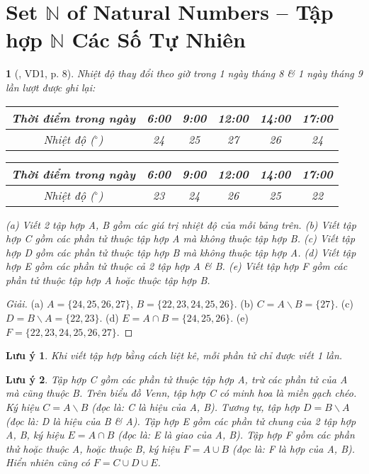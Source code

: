 \documentclass{article}
\newtheorem{baitoan}{}
\newtheorem{luuy}{Lưu ý}
\begin{document}

\section{Set $\mathbb{N}$ of Natural Numbers -- Tập hợp $\mathbb{N}$ Các Số Tự Nhiên}

\begin{baitoan}[\cite{Binh_boi_duong_Toan_6_tap_1}, VD1, p. 8]
	Nhiệt độ thay đổi theo giờ trong 1 ngày tháng 8 \& 1 ngày tháng 9 lần lượt được ghi lại:
	\begin{table}[H]
		\centering
		\begin{tabular}{|c|c|c|c|c|c|}
			\hline
			Thời điểm trong ngày & 6:00 & 9:00 & 12:00 & 14:00 & 17:00 \\
			\hline
			Nhiệt độ (${}^\circ$) & 24 & 25 & 27 & 26 & 24 \\
			\hline
		\end{tabular}
	\end{table}
	\begin{table}[H]
		\centering
		\begin{tabular}{|c|c|c|c|c|c|}
			\hline
			Thời điểm trong ngày & 6:00 & 9:00 & 12:00 & 14:00 & 17:00 \\
			\hline
			Nhiệt độ (${}^\circ$) & 23 & 24 & 26 & 25 & 22 \\
			\hline
		\end{tabular}
	\end{table}
	\noindent(a) Viết 2 tập hợp A, B gồm các giá trị nhiệt độ của mỗi bảng trên. (b) Viết tập hợp C gồm các phần tử thuộc tập hợp A mà không thuộc tập hợp B. (c) Viết tập hợp D gồm các phần tử thuộc tập hợp B mà không thuộc tập hợp A. (d) Viết tập hợp E gồm các phần tử thuộc cả 2 tập hợp A \& B. (e) Viết tập hợp F gồm các phần tử thuộc tập hợp A hoặc thuộc tập hợp B.
\end{baitoan}

\begin{proof}[Giải]
	(a) $A = \{24,25,26,27\}$, $B = \{22,23,24,25,26\}$. (b) $C = A\backslash B = \{27\}$. (c) $D = B\backslash A = \{22,23\}$. (d) $E = A\cap B = \{24,25,26\}$. (e) $F = \{22,23,24,25,26,27\}$.
\end{proof}

\begin{luuy}
	Khi viết tập hợp bằng cách liệt kê, mỗi phần tử chỉ được viết 1 lần.
\end{luuy}

\begin{luuy}
	Tập hợp C gồm các phần tử thuộc tập hợp A, trừ các phần tử của A mà cũng thuộc B. Trên biểu đồ Venn, tập hợp C có minh hoa là miền gạch chéo. Ký hiệu $C = A\backslash B$ (đọc là: C là {\rm hiệu} của A, B). Tương tự, tập hợp $D = B\backslash A$ (đọc là: D là hiệu của B \& A). Tập hợp E gồm các phần tử chung của 2 tập hợp A, B, ký hiệu $E = A\cap B$ (đọc là: E là {\rm giao} của A, B). Tập hợp F gồm các phần thử hoặc thuộc A, hoặc thuộc B, ký hiệu $F = A\cup B$ (đọc là: F là {\rm hợp} của A, B). Hiển nhiên cũng có $F = C\cup D\cup E$.
\end{luuy}
\end{document}
